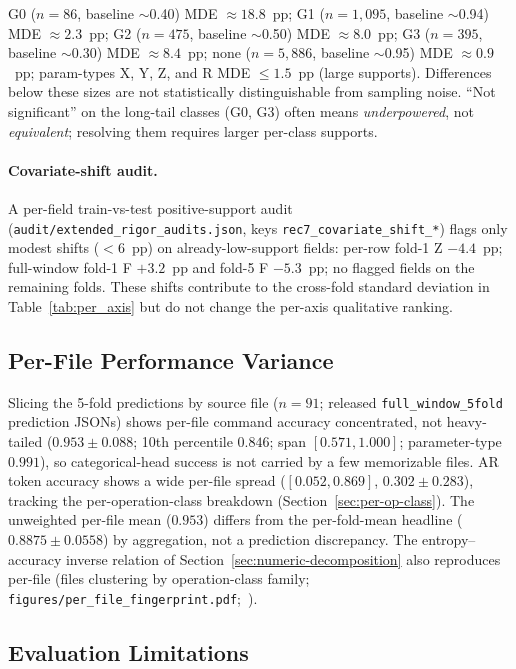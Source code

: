 \documentclass[sensors,article,submit,moreauthors,pdftex]{Definitions/mdpi}
\begin{document}
G0 ($n\!=\!86$, baseline $\sim$0.40) MDE $\approx 18.8$~pp; G1 ($n\!=\!1{,}095$, baseline $\sim$0.94) MDE $\approx 2.3$~pp; G2 ($n\!=\!475$, baseline $\sim$0.50) MDE $\approx 8.0$~pp; G3 ($n\!=\!395$, baseline $\sim$0.30) MDE $\approx 8.4$~pp; none ($n\!=\!5{,}886$, baseline $\sim$0.95) MDE $\approx 0.9$~pp; param-types X, Y, Z, and R MDE $\le 1.5$~pp (large supports). Differences below these sizes are not statistically distinguishable from sampling noise. ``Not significant'' on the long-tail classes (G0, G3) often means \emph{underpowered}, not \emph{equivalent}; resolving them requires larger per-class supports.

\paragraph{Covariate-shift audit.}\label{sec:lim-covariate} A per-field train-vs-test positive-support audit (\texttt{audit/extended\_rigor\_audits.json}, keys \texttt{rec7\_covariate\_shift\_*}) flags only modest shifts ($<\!6$~pp) on already-low-support fields: per-row fold-1 Z $-4.4$~pp; full-window fold-1 F $+3.2$~pp and fold-5 F $-5.3$~pp; no flagged fields on the remaining folds. These shifts contribute to the cross-fold standard deviation in Table~\ref{tab:per_axis} but do not change the per-axis qualitative ranking.

\subsection{Per-File Performance Variance}
\label{sec:lim-per-file}

Slicing the 5-fold predictions by source file ($n=91$; released \texttt{full\_window\_5fold} prediction JSONs) shows per-file command accuracy concentrated, not heavy-tailed ($0.953 \pm 0.088$; 10th percentile $0.846$; span $[0.571, 1.000]$; parameter-type $0.991$), so categorical-head success is not carried by a few memorizable files. AR token accuracy shows a wide per-file spread ($[0.052, 0.869]$, $0.302 \pm 0.283$), tracking the per-operation-class breakdown (Section~\ref{sec:per-op-class}). The unweighted per-file mean ($0.953$) differs from the per-fold-mean headline ($0.8875 \pm 0.0558$) by aggregation, not a prediction discrepancy. The entropy--accuracy inverse relation of Section~\ref{sec:numeric-decomposition} also reproduces per-file (files clustering by operation-class family; \texttt{figures/per\_file\_fingerprint.pdf};~\cite{paperB_entropy}).

\subsection{Evaluation Limitations}
\label{sec:lim-eval}
\end{document}
